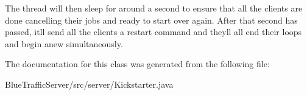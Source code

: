 The thread will then sleep for around a second to ensure that all the clients are done cancelling their jobs and ready to start over again. After that second has passed, it\textquotesingle{}ll send all the clients a \textquotesingle{}restart\textquotesingle{} command and they\textquotesingle{}ll all end their loops and begin anew simultaneously. 

The documentation for this class was generated from the following file\+:\begin{DoxyCompactItemize}
\item 
Blue\+Traffic\+Server/src/server/Kickstarter.\+java\end{DoxyCompactItemize}
